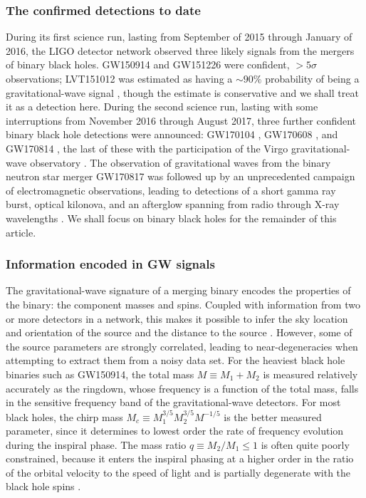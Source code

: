 \documentclass[iop,onecolumn]{revtex4}
\begin{document}
\subsubsection{The confirmed detections to date}
During its first science run, lasting from September of 2015 through January of 2016, the LIGO detector network observed three likely signals from the mergers of binary black holes.  GW150914 \citep{GW150914} and GW151226 \citep{GW151226} were confident, $> 5\sigma$ observations; LVT151012 was estimated as having a $\sim 90\%$ probability of being a gravitational-wave signal \citep{GW150914:rates,BBH:O1}, though the estimate is conservative and we shall treat it as a detection here.  During the second science run, lasting with some interruptions from November 2016 through August 2017, three further confident binary black hole detections were announced: GW170104 \citep{GW170104},  GW170608 \citep{GW170608}, and GW170814 \citep{GW170814}, the last of these with the participation of the Virgo gravitational-wave observatory \citep{AdvVirgo}.   The observation of gravitational waves from the binary neutron star merger GW170817 \citep{GW170817} was followed up by an unprecedented campaign of electromagnetic observations, leading to detections of a short gamma ray burst, optical kilonova, and an afterglow spanning from radio through X-ray wavelengths \citep{GW170817:GRB,GW170817:MMA}.  We shall focus on binary black holes for the remainder of this article.

\subsubsection{Information encoded in GW signals}
The gravitational-wave signature of a merging binary encodes the properties of the binary: the component masses and spins. Coupled with information from two or more detectors in a network, this makes it possible to infer the sky location and orientation of the source and the distance to the source \citep{Veitch:2015,GW150914:PE}.  However, some of the source parameters are strongly correlated, leading to near-degeneracies when attempting to extract them from a noisy data set.   For the heaviest black hole binaries such as GW150914, the total mass $M \equiv M_1 + M_2$ is measured relatively accurately as the ringdown, whose frequency is a function of the total mass, falls in the sensitive frequency band of the gravitational-wave detectors.  For most black holes, the chirp mass $M_c \equiv M_1^{3/5} M_2^{3/5} M^{-1/5}$ is the better measured parameter, since it determines to lowest order the rate of frequency evolution during the inspiral phase.  The mass ratio $q\equiv M_2/M_1 \leq 1$ is often quite poorly constrained, because it enters the inspiral phasing at a higher order in the ratio of the orbital velocity to the speed of light and is partially degenerate with the black hole spins \citep[e.g.,][]{PoissonWill:1995}.  
\end{document}
